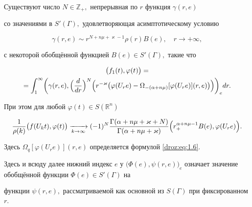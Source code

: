 \begin{theorem}[1]
Существуют число $N\in \mathbb Z_{+},$ непрерывная по $r$ функция $\gamma (r,e)$

со значениями в $S'(\Gamma),$ удовлетворяющая асимптотическому условию

\begin{equation*}


\gamma (r,e) \sim r^{N+n\mu+\varkappa-1}\rho(r)B(e),\quad r\to +\infty,

\end{equation*}

с некоторой обобщённой функцией $B(e) \in S'(\Gamma),$ такие что

\begin{multline*} 


\bigl(f_1(t),\varphi(t)\bigr)=\\

=\int _1^{\infty}\biggl( \gamma(r,e), \Bigl(\frac{d}{dr}\Bigr)^N\Bigl(r^{-\varkappa} \bigr(\varphi(U_re)-\Omega_{-(\alpha+n\mu)}[\varphi(U_re)](r,e)\bigr)\Bigr)\biggr)_e dr.

\end{multline*}

При этом для любой $\varphi(t) \in S(\mathbb R^n)$

\begin{multline*} 


\frac1{\rho(k)}\bigl(f(U_kt),\varphi(t)\bigr) \xrightarrow [k\to \infty]{} 

(-1)^N\frac{\Gamma(\alpha +n\mu +\varkappa +N)}{\Gamma(\alpha +n\mu+\varkappa)}

\Bigr(r_{+}^{\alpha +n\mu -1} B(e),\varphi(U_re)\Bigl).

\end{multline*}

Здесь $\Omega_q[\varphi(U_re)](r,e)$ определяется формулой \eqref{droz:eq:1.6}\rm.

\end{theorem}





\smallskip



Здесь и всюду далее нижний индекс $e$ у $\bigl(\Phi(e) ,\psi(r,e )\bigr)_e$ означает значение обобщённой функции $\Phi(e)\in S'(\Gamma)$ на

функции $\psi(r,e),$ рассматриваемой как основной из $S(\Gamma)$ при фиксированном $r.$




